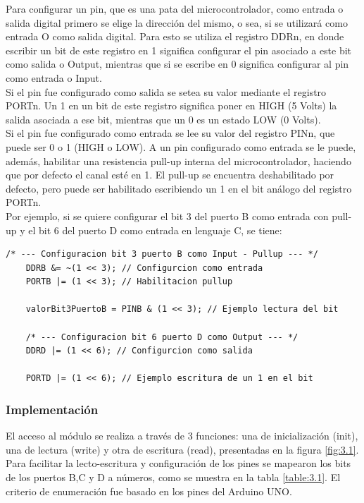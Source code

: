 Para configurar un pin, que es una pata del microcontrolador, como entrada o salida digital primero se elige la dirección del mismo, o sea, si se utilizará como entrada O como salida digital. Para esto se utiliza el registro DDRn, en donde escribir un bit de este registro en 1 significa configurar el pin asociado a este bit como salida o Output, mientras que si se escribe en 0 significa configurar al pin como entrada o Input. \\
Si el pin fue configurado como salida se setea su valor mediante el registro PORTn. Un 1 en un bit de este registro significa poner en HIGH (5 Volts) la salida asociada a ese bit, mientras que un 0 es un estado LOW (0 Volts).\\
Si el pin fue configurado como entrada se lee su valor del registro PINn, que puede ser 0 o 1 (HIGH o LOW). A un pin configurado como entrada se le puede, además, habilitar una resistencia pull-up interna del microcontrolador, haciendo que por defecto el canal esté en 1. El pull-up se encuentra deshabilitado por defecto, pero puede ser habilitado escribiendo un 1 en el bit análogo del registro PORTn.\\
Por ejemplo, si se quiere configurar el bit 3 del puerto B como entrada con pull-up y el bit 6 del puerto D como entrada en lenguaje C, se tiene:

\begin{lstlisting}[style=CStyle]
	/* --- Configuracion bit 3 puerto B como Input - Pullup --- */
	DDRB &= ~(1 << 3); // Configurcion como entrada
	PORTB |= (1 << 3); // Habilitacion pullup
	
	valorBit3PuertoB = PINB & (1 << 3); // Ejemplo lectura del bit
	
	/* --- Configuracion bit 6 puerto D como Output --- */
	DDRD |= (1 << 6); // Configurcion como salida
	
	PORTD |= (1 << 6); // Ejemplo escritura de un 1 en el bit
\end{lstlisting}

\subsubsection{Implementación}
El acceso al módulo se realiza a través de 3 funciones: una de inicialización (init), una de lectura (write) y otra de escritura (read), presentadas en la figura \ref{fig:3.1}. \\
Para facilitar la lecto-escritura y configuración de los pines se mapearon los bits de los puertos B,C y D a números, como se muestra en la tabla \ref{table:3.1}. El criterio de enumeración fue basado en los pines del Arduino UNO.

